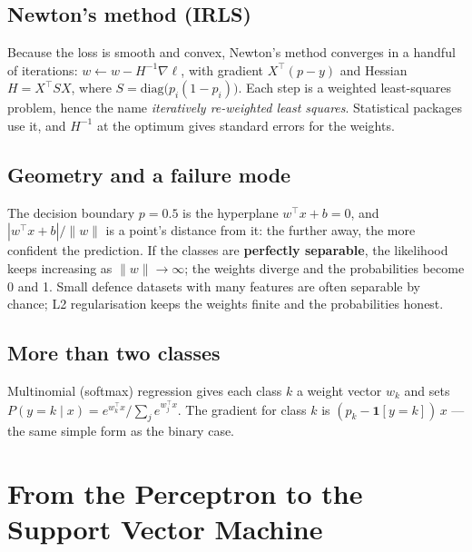\documentclass[11pt]{article}
\begin{document}
\subsection{Newton's method (IRLS)}
Because the loss is smooth and convex, Newton's method converges in a handful of iterations: $w\leftarrow w-H^{-1}\nabla\ell$, with gradient $X^\top(p-y)$ and Hessian $H=X^\top SX$, where $S=\text{diag}\big(p_i(1-p_i)\big)$. Each step is a weighted least-squares problem, hence the name \emph{iteratively re-weighted least squares}. Statistical packages use it, and $H^{-1}$ at the optimum gives standard errors for the weights.
\subsection{Geometry and a failure mode}
The decision boundary $p=0.5$ is the hyperplane $w^\top x+b=0$, and $|w^\top x+b|/\|w\|$ is a point's distance from it: the further away, the more confident the prediction. If the classes are \textbf{perfectly separable}, the likelihood keeps increasing as $\|w\|\to\infty$; the weights diverge and the probabilities become 0 and 1. Small defence datasets with many features are often separable by chance; L2 regularisation keeps the weights finite and the probabilities honest.
\subsection{More than two classes}
Multinomial (softmax) regression gives each class $k$ a weight vector $w_k$ and sets $P(y=k\mid x)=e^{w_k^\top x}/\sum_je^{w_j^\top x}$. The gradient for class $k$ is $(p_k-\mathbf 1[y=k])\,x$ --- the same simple form as the binary case.

\section{From the Perceptron to the Support Vector Machine}
\end{document}
